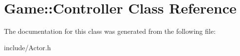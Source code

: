 \hypertarget{classGame_1_1Controller}{\section{Game\-:\-:Controller Class Reference}
\label{classGame_1_1Controller}
}


The documentation for this class was generated from the following file\-:\begin{DoxyCompactItemize}
\item 
include/Actor.\-h\end{DoxyCompactItemize}
